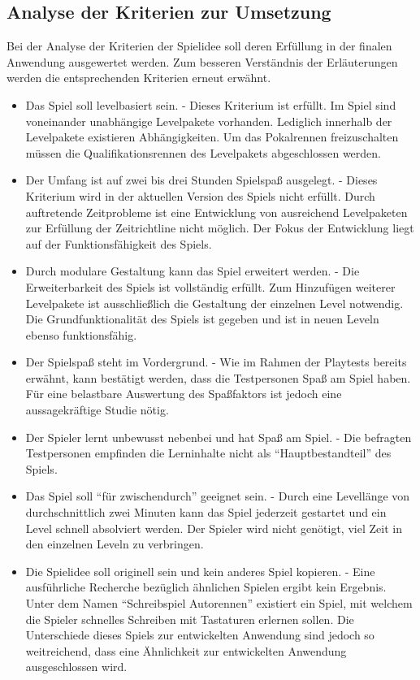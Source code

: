 \subsection{Analyse der Kriterien zur Umsetzung}
Bei der Analyse der Kriterien der Spielidee soll deren Erfüllung in der finalen Anwendung ausgewertet werden.
Zum besseren Verständnis der Erläuterungen werden die entsprechenden Kriterien erneut erwähnt.
\begin{itemize}
    \item{Das Spiel soll levelbasiert sein. - Dieses Kriterium ist erfüllt. Im Spiel sind voneinander unabhängige Levelpakete vorhanden. Lediglich innerhalb der Levelpakete existieren Abhängigkeiten. Um das Pokalrennen freizuschalten müssen die Qualifikationsrennen des Levelpakets abgeschlossen werden.}
    \item{Der Umfang ist auf zwei bis drei Stunden Spielspaß ausgelegt. - Dieses Kriterium wird in der aktuellen Version des Spiels nicht erfüllt. Durch auftretende Zeitprobleme ist eine Entwicklung von ausreichend Levelpaketen zur Erfüllung der Zeitrichtline nicht möglich. Der Fokus der Entwicklung liegt auf der Funktionsfähigkeit des Spiels.}
    \item{Durch modulare Gestaltung kann das Spiel erweitert werden. - Die Erweiterbarkeit des Spiels ist vollständig erfüllt. Zum Hinzufügen weiterer Levelpakete ist ausschließlich die Gestaltung der einzelnen Level notwendig. Die Grundfunktionalität des Spiels ist gegeben und ist in neuen Leveln ebenso funktionsfähig.}
    \item{Der Spielspaß steht im Vordergrund. - Wie im Rahmen der Playtests bereits erwähnt, kann bestätigt werden, dass die Testpersonen Spaß am Spiel haben. Für eine belastbare Auswertung des Spaßfaktors ist jedoch eine aussagekräftige Studie nötig. }
    \item{Der Spieler lernt unbewusst nebenbei und hat Spaß am Spiel. - Die befragten Testpersonen empfinden die Lerninhalte nicht als \enquote{Hauptbestandteil} des Spiels.}
    \item{Das Spiel soll \enquote{für zwischendurch} geeignet sein. - Durch eine Levellänge von durchschnittlich zwei Minuten kann das Spiel jederzeit gestartet und ein Level schnell absolviert werden. Der Spieler wird nicht genötigt, viel Zeit in den einzelnen Leveln zu verbringen.}
    \item{Die Spielidee soll originell sein und kein anderes Spiel kopieren. - Eine ausführliche Recherche bezüglich ähnlichen Spielen ergibt kein Ergebnis. Unter dem Namen \enquote{Schreibspiel Autorennen} existiert ein Spiel, mit welchem die Spieler schnelles Schreiben mit Tastaturen erlernen sollen. Die Unterschiede dieses Spiels zur entwickelten Anwendung sind jedoch so weitreichend, dass eine Ähnlichkeit zur entwickelten Anwendung ausgeschlossen wird.}

\end{itemize}
